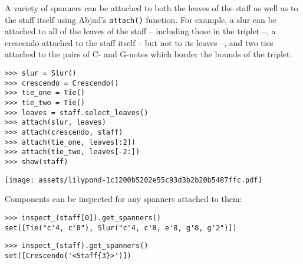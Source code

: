 \noindent A variety of spanners can be attached to both the leaves of the staff
as well as to the staff itself using Abjad's \texttt{attach()} function. For
example, a slur can be attached to all of the leaves of the staff -- including
those in the triplet --, a crescendo attached to the staff itself -- but not to
its leaves --, and two ties attached to the pairs of C- and G-notes which
border the bounds of the triplet:

\begin{comment}
<abjad>
slur = Slur()
crescendo = Crescendo()
tie_one = Tie()
tie_two = Tie()
leaves = staff.select_leaves()
attach(slur, leaves)
attach(crescendo, staff)
attach(tie_one, leaves[:2])
attach(tie_two, leaves[-2:])
show(staff)
</abjad>
\end{comment}

\begin{abjadbookoutput}
\begin{singlespacing}
\vspace{-0.5\baselineskip}
\begin{lstlisting}
>>> slur = Slur()
>>> crescendo = Crescendo()
>>> tie_one = Tie()
>>> tie_two = Tie()
>>> leaves = staff.select_leaves()
>>> attach(slur, leaves)
>>> attach(crescendo, staff)
>>> attach(tie_one, leaves[:2])
>>> attach(tie_two, leaves[-2:])
>>> show(staff)
\end{lstlisting}
\noindent\texttt{[image: assets/lilypond-1c1200b5202e55c93d3b2b20b5487ffc.pdf]}
\end{singlespacing}
\end{abjadbookoutput}

\noindent Components can be inspected for any spanners attached to them:

\begin{comment}
<abjad>
inspect_(staff[0]).get_spanners()
inspect_(staff).get_spanners()
</abjad>
\end{comment}

\begin{abjadbookoutput}
\begin{singlespacing}
\vspace{-0.5\baselineskip}
\begin{lstlisting}
>>> inspect_(staff[0]).get_spanners()
set([Tie("c'4, c'8"), Slur("c'4, c'8, e'8, g'8, g'2")])
\end{lstlisting}
\begin{lstlisting}
>>> inspect_(staff).get_spanners()
set([Crescendo('<Staff{3}>')])
\end{lstlisting}
\end{singlespacing}
\end{abjadbookoutput}

